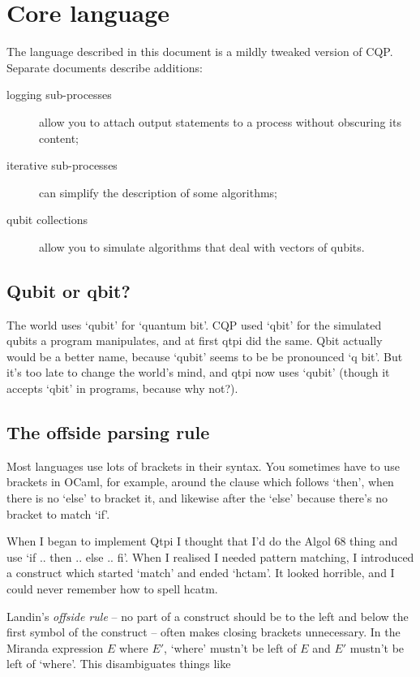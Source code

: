 \documentclass[11pt,a4paper]{article}
\begin{document}
\section{Core language}

The language described in this document is a mildly tweaked version of CQP. Separate documents describe additions:  

\begin{description}
\item[logging sub-processes] allow you to attach output statements to a process without obscuring its content;  
\item[iterative sub-processes] can simplify the description of some algorithms;  
\item[qubit collections] allow you to simulate algorithms that deal with vectors of qubits.
\end{description}
 
\subsection{Qubit or qbit?}
The world uses `qubit' for `quantum bit'. CQP used `qbit' for the simulated qubits a program manipulates, and at first qtpi did the same. Qbit actually would be a better name, because `qubit' seems to be be pronounced `q bit'. But it's too late to change the world's mind, and qtpi now uses `qubit' (though it accepts `qbit' in programs, because why not?).

\subsection{The offside parsing rule}

Most languages use lots of brackets in their syntax. You sometimes have to use brackets in OCaml, for example, around the clause which follows `then', when there is no `else' to bracket it, and likewise after the `else' because there's no bracket to match `if'.

When I began to implement Qtpi I thought that I'd do the Algol 68 thing and use `if .. then .. else .. fi'. When I realised I needed pattern matching, I introduced a construct which started `match' and ended `hctam'. It looked horrible, and I could never remember how to spell hcatm.

Landin's \emph{offside rule} -- no part of a construct should be to the left and below the first symbol of the construct -- often makes closing brackets unnecessary. In the Miranda expression $E$ where $E'$, `where' mustn't be left of $E$ and $E'$ mustn't be left of `where'. This disambiguates things like 
\end{document}
